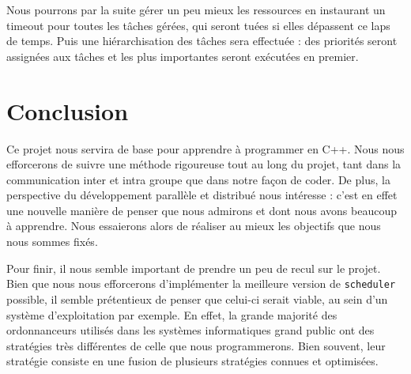 \documentclass[a4paper,11pt,final]{report}
\begin{document}
        Nous pourrons par la suite gérer un peu mieux les ressources en instaurant un timeout pour toutes les tâches gérées, qui seront tuées si elles dépassent ce laps de temps. Puis une hiérarchisation des tâches sera effectuée : des priorités seront assignées aux tâches et les plus importantes seront exécutées en premier.

\chapter{Conclusion}

    Ce projet nous servira de base pour apprendre à programmer en C++. Nous nous efforcerons de suivre une méthode rigoureuse tout au long du projet, tant dans la communication inter et intra groupe que dans notre façon de coder.
    De plus, la perspective du développement parallèle et distribué nous intéresse : c'est en effet une nouvelle manière de penser que nous admirons et dont nous avons beaucoup à apprendre. Nous essaierons alors de réaliser au mieux les objectifs que nous nous sommes fixés. \newline
    
    Pour finir, il nous semble important de prendre un peu de recul sur le projet. Bien que nous nous efforcerons d'implémenter la meilleure version de \texttt{scheduler} possible, il semble prétentieux de penser que celui-ci serait viable, au sein d'un système d'exploitation par exemple. En effet, la grande majorité des ordonnanceurs utilisés dans les systèmes informatiques grand public ont des stratégies très différentes de celle que nous programmerons. Bien souvent, leur stratégie consiste en une fusion de plusieurs stratégies connues et optimisées. 
\end{document}
